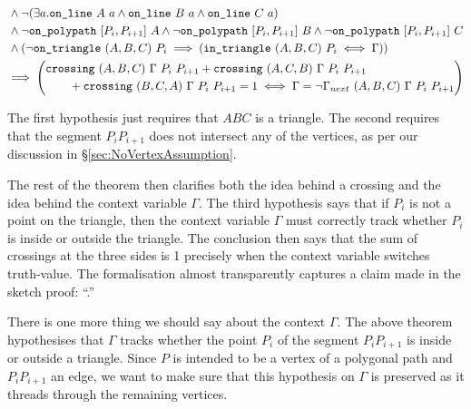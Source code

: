 \begin{multline}
  \begin{aligned}
    &\wedge \Triangle{a}{A}{B}{C}\\
    &\wedge \neg\code{on\_polypath}\ [P_i,P_{i+1}]\ A\wedge \neg\code{on\_polypath}\ [P_i,P_{i+1}]\ B\wedge \neg\code{on\_polypath}\ [P_i,P_{i+1}]\ C\\
    &\wedge(\neg\code{on\_triangle}\ (A,B,C)\ P_i \implies (\code{in\_triangle}\ (A,B,C)\ P_i \iff \Gamma))\\
  \end{aligned}\\
    \implies\left(\begin{aligned}[]
        &\code{crossing}\ (A,B,C)\ \Gamma\ P_i\ P_{i+1} + \code{crossing}\ (A,C,B)\ \Gamma\ P_i\ P_{i+1}\\
          &\qquad+ \code{crossing}\ (B,C,A)\ \Gamma\ P_i\ P_{i+1} = 1  \iff \Gamma = \neg \Gamma_{next}\ (A,B,C)\ \Gamma\ P_i\ P_{i+1}
        \end{aligned}\right)
\end{multline}

The first hypothesis just requires that $ABC$ is a triangle. The second requires that the segment $P_iP_{i+1}$ does not intersect any of the vertices, as per our discussion in \S\ref{sec:NoVertexAssumption}. 

The rest of the theorem then clarifies both the idea behind a crossing and the idea behind the context variable $\Gamma$. The third hypothesis says that if $P_i$ is not a point on the triangle, then the context variable $\Gamma$ must correctly track whether $P_i$ is inside or outside the triangle. The conclusion then says that the sum of crossings at the three sides is 1 precisely when the context variable switches truth-value. The formalisation almost transparently captures a claim made in the sketch proof: ``\insideoutsideclaim.''

There is one more thing we should say about the context $\Gamma$. The above theorem hypothesises that $\Gamma$ tracks whether the point $P_i$ of the segment $P_iP_{i+1}$ is inside or outside a triangle. Since $P$ is intended to be a vertex of a polygonal path and $P_iP_{i+1}$ an edge, we want to make sure that this hypothesis on $\Gamma$ is preserved as it threads through the remaining vertices. 


